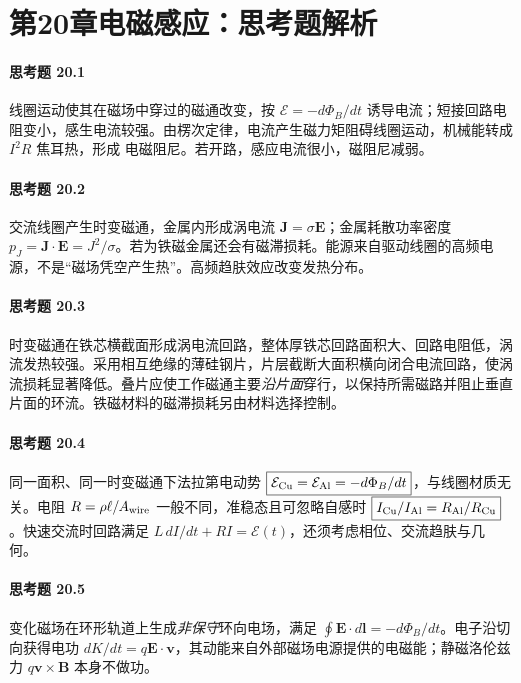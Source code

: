\section*{第20章\quad 电磁感应：思考题解析}
\paragraph{思考题 20.1}
线圈运动使其在磁场中穿过的磁通改变，按 \(\mathcal E=-d\Phi_B/dt\) 诱导电流；短接回路电阻变小，感生电流较强。由楞次定律，电流产生磁力矩阻碍线圈运动，机械能转成 \(I^2R\) 焦耳热，形成 \(\boxed{\text{电磁阻尼}}\)。若开路，感应电流很小，磁阻尼减弱。

\paragraph{思考题 20.2}
交流线圈产生时变磁通，金属内形成涡电流 \(\boldsymbol J=\sigma\boldsymbol E\)；金属耗散功率密度 \(\boxed{p_J=\boldsymbol J\cdot\boldsymbol E=J^2/\sigma}\)。若为铁磁金属还会有磁滞损耗。能源来自驱动线圈的高频电源，不是“磁场凭空产生热”。高频趋肤效应改变发热分布。

\paragraph{思考题 20.3}
时变磁通在铁芯横截面形成涡电流回路，整体厚铁芯回路面积大、回路电阻低，涡流发热较强。采用相互绝缘的薄硅钢片，片层截断大面积横向闭合电流回路，使涡流损耗显著降低。叠片应使工作磁通主要\emph{沿片面}穿行，以保持所需磁路并阻止垂直片面的环流。铁磁材料的磁滞损耗另由材料选择控制。

\paragraph{思考题 20.4}
同一面积、同一时变磁通下法拉第电动势 \(\boxed{\mathcal E_{\rm Cu}=\mathcal E_{\rm Al}=-d\Phi_B/dt}\)，与线圈材质无关。电阻 \(R=\rho \ell/A_{\rm wire}\) 一般不同，准稳态且可忽略自感时 \(\boxed{I_{\rm Cu}/I_{\rm Al}=R_{\rm Al}/R_{\rm Cu}}\)。快速交流时回路满足 \(L\,dI/dt+RI=\mathcal E(t)\)，还须考虑相位、交流趋肤与几何。

\paragraph{思考题 20.5}
变化磁场在环形轨道上生成\emph{非保守}环向电场，满足 \(\oint\boldsymbol E\cdot d\boldsymbol l=-d\Phi_B/dt\)。电子沿切向获得电功 \(dK/dt=q\boldsymbol E\cdot\boldsymbol v\)，其动能来自外部磁场电源提供的电磁能；静磁洛伦兹力 \(q\boldsymbol v\times\boldsymbol B\) 本身不做功。

